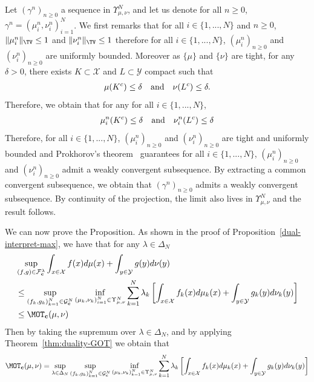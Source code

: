 \begin{prv*}
\begin{prv*}
Let $(\gamma^n)_{n\geq 0}$ a sequence in $\Upsilon^N_{\mu,\nu}$, and let us denote for all $n\geq 0$, $\gamma^n=(\mu^n_i,\nu^n_i)_{i=1}^N$. We first remarks that for all $i\in\{1,...,N\}$ and $n\geq 0$, $\Vert \mu_i^n\Vert_{\TV} \leq 1$ and $\Vert \nu_i^n\Vert_{\TV} \leq 1$ therefore for all $i\in\{1,...,N\}$, $(\mu^n_i)_{n\geq 0}$ and $(\nu^n_i)_{n\geq 0}$  are uniformly bounded. Moreover as $\{\mu\}$ and $\{\nu\}$ are tight, for any $\delta>0$, there exists $K\subset \mathcal{X} $ and $L\subset \mathcal{Y}$ compact such that 
\begin{align}
    \mu(K^c)\leq \delta \text{\quad and\quad }  \nu(L^c)\leq \delta.
\end{align}
Therefore, we obtain that for any for all $i\in\{1,...,N\}$, 
\begin{align}
    \mu_i^n(K^c)\leq \delta \text{\quad and\quad }  \nu_i^n(L^c)\leq \delta
\end{align}
Therefore, for all $i\in\{1,...,N\}$,  $(\mu_i^n)_{n\geq 0}$ and $(\nu_i^n)_{n\geq 0}$ are tight and uniformly bounded and Prokhorov's theorem~\citep[Theorem A.3.15]{dupuis2011weak} guarantees for all $i\in\{1,...,N\}$,  $(\mu_i^n)_{n\geq 0}$ and $(\nu_i^n)_{n\geq 0}$ admit a weakly convergent subsequence. By extracting a common convergent subsequence, we obtain that $(\gamma^n)_{n\geq 0}$ admits a weakly convergent subsequence. By continuity of the projection, the limit also lives in $\Upsilon
^N_{\mu,\nu}$ and the result follows.
\end{prv*}
We can now prove the Proposition. As shown in the proof of Proposition~\ref{dual-interpret-max}, we have that for any $\lambda\in\Delta_N$
\begin{align*}
      &\sup\limits_{(f,g)\in\mathcal{F}_{\mathbf{c}}^{\lambda}} \int_{x\in\mathcal{X}} f(x)d\mu(x)+ \int_{y\in\mathcal{Y}} g(y)d\nu(y)\\
  &\leq \sup\limits_{(f_k,g_k)_{k=1}^N\in  \mathcal{G}^{N}_{\mathbf{c}}} \inf_{(\mu_k,\nu_k)_{i=1}^N\in\Upsilon_{\mu,\nu}^N } \sum_{k=1}^N \lambda_k \left[\int_{x\in\mathcal{X}} f_k(x)d\mu_k(x)+ \int_{y\in\mathcal{Y}} g_k(y)d\nu_k(y)\right]\\
  &\leq \MOT_{\mathbf{c}}(\mu,\nu)
\end{align*}
Then by taking the supremum over $\lambda\in\Delta_N$, and by applying Theorem~\ref{thm:duality-GOT} we obtain that
\begin{align*}
\MOT_{\mathbf{c}}(\mu,\nu)
 =\sup_{\lambda\in \Delta_N} \sup\limits_{(f_k,g_k)_{k=1}^N\in  \mathcal{G}^{N}_{\mathbf{c}}} \inf_{(\mu_k,\nu_k)_{k=1}^N\in\Upsilon_{\mu,\nu}^N } \sum_{k=1}^N \lambda_k \left[\int_{x\in\mathcal{X}} f_k(x)d\mu_k(x)+ \int_{y\in\mathcal{Y}} g_k(y)d\nu_k(y)\right]

\end{align*}
\end{prv*}
